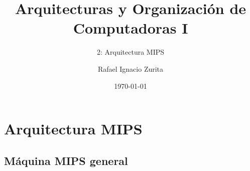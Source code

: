 \documentclass[aspectratio=169,compress]{beamer}
\title{Arquitecturas y Organización de Computadoras I}
\subtitle{2: Arquitectura MIPS}
\author{Rafael Ignacio Zurita}
\institute{Depto. Ingeniería de Computadoras}
\date{\today}
\begin{document}
 
\begin{frame}
\bigskip
  \maketitle
\end{frame}







\section{Arquitectura MIPS}



\subsection{Máquina MIPS general}
\end{document}
